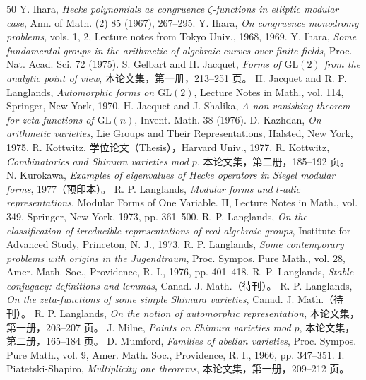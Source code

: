 \begin{thebibliography}{50}
 Y. Ihara, \textit{Hecke polynomials as congruence $\zeta$-functions in elliptic modular case}, Ann. of Math. (2) 85 (1967), 267--295.
 Y. Ihara, \textit{On congruence monodromy problems}, vols. 1, 2, Lecture notes from Tokyo Univ., 1968, 1969.
 Y. Ihara, \textit{Some fundamental groups in the arithmetic of algebraic curves over finite fields}, Proc. Nat. Acad. Sci. 72 (1975).
 S. Gelbart and H. Jacquet, \textit{Forms of $\mathrm{GL}(2)$ from the analytic point of view}, 本论文集，第一册，213--251 页。
 H. Jacquet and R. P. Langlands, \textit{Automorphic forms on $\mathrm{GL}(2)$}, Lecture Notes in Math., vol. 114, Springer, New York, 1970.
 H. Jacquet and J. Shalika, \textit{A non-vanishing theorem for zeta-functions of $\mathrm{GL}(n)$}, Invent. Math. 38 (1976).
 D. Kazhdan, \textit{On arithmetic varieties}, Lie Groups and Their Representations, Halsted, New York, 1975.
 R. Kottwitz, 学位论文（Thesis），Harvard Univ., 1977.
 R. Kottwitz, \textit{Combinatorics and Shimura varieties mod $p$}, 本论文集，第二册，185--192 页。
 N. Kurokawa, \textit{Examples of eigenvalues of Hecke operators in Siegel modular forms}, 1977（预印本）。
 R. P. Langlands, \textit{Modular forms and $l$-adic representations}, Modular Forms of One Variable. II, Lecture Notes in Math., vol. 349, Springer, New York, 1973, pp. 361--500.
 R. P. Langlands, \textit{On the classification of irreducible representations of real algebraic groups}, Institute for Advanced Study, Princeton, N. J., 1973.
 R. P. Langlands, \textit{Some contemporary problems with origins in the Jugendtraum}, Proc. Sympos. Pure Math., vol. 28, Amer. Math. Soc., Providence, R. I., 1976, pp. 401--418.
 R. P. Langlands, \textit{Stable conjugacy: definitions and lemmas}, Canad. J. Math.（待刊）。
 R. P. Langlands, \textit{On the zeta-functions of some simple Shimura varieties}, Canad. J. Math.（待刊）。
 R. P. Langlands, \textit{On the notion of automorphic representation}, 本论文集，第一册，203--207 页。
 J. Milne, \textit{Points on Shimura varieties mod $p$}, 本论文集，第二册，165--184 页。
 D. Mumford, \textit{Families of abelian varieties}, Proc. Sympos. Pure Math., vol. 9, Amer. Math. Soc., Providence, R. I., 1966, pp. 347--351.
 I. Piatetski-Shapiro, \textit{Multiplicity one theorems}, 本论文集，第一册，209--212 页。

\end{thebibliography}
